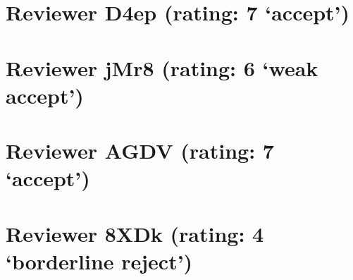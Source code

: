 \documentclass{article}
\begin{document}
\section{Reviewer D4ep (rating: 7 `accept')}

\section{Reviewer jMr8 (rating: 6 `weak accept')}

\section{Reviewer AGDV (rating: 7 `accept')}

\section{Reviewer 8XDk (rating: 4 `borderline reject')}
\end{document}
